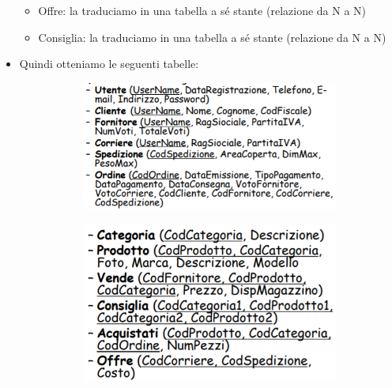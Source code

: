 \begin{itemize}
\begin{itemize}
		\item Offre: la traduciamo in una tabella a sé stante
		(relazione da N a N) 
		\item Consiglia: la traduciamo in una tabella a sé stante
		(relazione da N a N)
	\end{itemize}
	\item Quindi otteniamo le seguenti tabelle:
	\begin{figure}[h]
		\begin{subfigure}{0.5\textwidth}
			\includegraphics[width=0.9\linewidth]{images/91.PNG}
		\end{subfigure}
		\begin{subfigure}{0.5\textwidth}
			\includegraphics[width=0.9\linewidth]{images/92.PNG}
		\end{subfigure}
	\end{figure}
	
\end{itemize}
